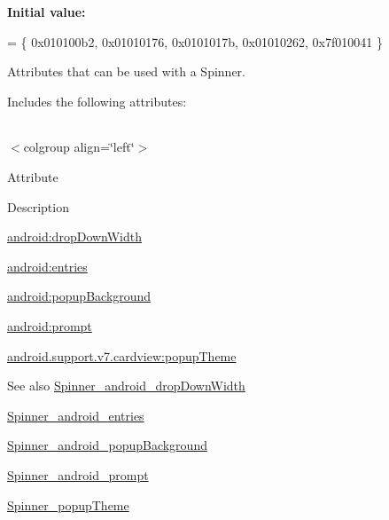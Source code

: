 {\bfseries Initial value\+:}
\begin{DoxyCode}
= \{
            0x010100b2, 0x01010176, 0x0101017b, 0x01010262,
            0x7f010041
        \}
\end{DoxyCode}
Attributes that can be used with a Spinner. 

Includes the following attributes\+:

\tabulinesep=1mm
\begin{longtabu} spread 0pt [c]{*{0}{|X[-1]}|}
\hline
\end{longtabu}
$<$colgroup align=\char`\"{}left\char`\"{}$>$ 

Attribute

Description 

{\ttfamily \hyperlink{classandroid_1_1support_1_1v7_1_1cardview_1_1R_1_1styleable_af98af2c6d2e0644eec83ef48d02be102}{android\+:drop\+Down\+Width}}

{\ttfamily \hyperlink{classandroid_1_1support_1_1v7_1_1cardview_1_1R_1_1styleable_acdfba553940dcc6367b563bb8c3b9672}{android\+:entries}}

{\ttfamily \hyperlink{classandroid_1_1support_1_1v7_1_1cardview_1_1R_1_1styleable_a4f0b0a21325a8ab495843ba149f8b532}{android\+:popup\+Background}}

{\ttfamily \hyperlink{classandroid_1_1support_1_1v7_1_1cardview_1_1R_1_1styleable_ae19e4b2683fbfaad925e3b99991c6887}{android\+:prompt}}

{\ttfamily \hyperlink{classandroid_1_1support_1_1v7_1_1cardview_1_1R_1_1styleable_ad9a6671f55c713c647bb4e3c5f60946f}{android.\+support.\+v7.\+cardview\+:popup\+Theme}}

\begin{DoxySeeAlso}{See also}
\hyperlink{classandroid_1_1support_1_1v7_1_1cardview_1_1R_1_1styleable_af98af2c6d2e0644eec83ef48d02be102}{Spinner\+\_\+android\+\_\+drop\+Down\+Width} 

\hyperlink{classandroid_1_1support_1_1v7_1_1cardview_1_1R_1_1styleable_acdfba553940dcc6367b563bb8c3b9672}{Spinner\+\_\+android\+\_\+entries} 

\hyperlink{classandroid_1_1support_1_1v7_1_1cardview_1_1R_1_1styleable_a4f0b0a21325a8ab495843ba149f8b532}{Spinner\+\_\+android\+\_\+popup\+Background} 

\hyperlink{classandroid_1_1support_1_1v7_1_1cardview_1_1R_1_1styleable_ae19e4b2683fbfaad925e3b99991c6887}{Spinner\+\_\+android\+\_\+prompt} 

\hyperlink{classandroid_1_1support_1_1v7_1_1cardview_1_1R_1_1styleable_ad9a6671f55c713c647bb4e3c5f60946f}{Spinner\+\_\+popup\+Theme} 
\end{DoxySeeAlso}
\mbox{\label{classandroid_1_1support_1_1v7_1_1cardview_1_1R_1_1styleable_af98af2c6d2e0644eec83ef48d02be102}} 
